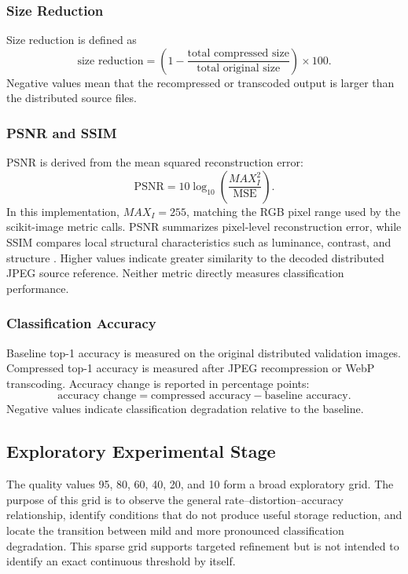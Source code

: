 \subsubsection{Size Reduction}

Size reduction is defined as
\[
\text{size reduction} =
\left(1 - \frac{\text{total compressed size}}{\text{total original size}}\right)
\times 100.
\]
Negative values mean that the recompressed or transcoded output is larger than the distributed source files.

\subsubsection{PSNR and SSIM}

PSNR is derived from the mean squared reconstruction error:
\[
\mathrm{PSNR} = 10 \log_{10}\left(\frac{MAX_I^2}{\mathrm{MSE}}\right).
\]
In this implementation, \(MAX_I = 255\), matching the RGB pixel range used by the scikit-image metric calls. PSNR summarizes pixel-level reconstruction error, while SSIM compares local structural characteristics such as luminance, contrast, and structure \cite{wang2004ssim}. Higher values indicate greater similarity to the decoded distributed JPEG source reference. Neither metric directly measures classification performance.

\subsubsection{Classification Accuracy}

Baseline top-1 accuracy is measured on the original distributed validation images. Compressed top-1 accuracy is measured after JPEG recompression or WebP transcoding. Accuracy change is reported in percentage points:
\[
\text{accuracy change} =
\text{compressed accuracy} - \text{baseline accuracy}.
\]
Negative values indicate classification degradation relative to the baseline.

\subsection{Exploratory Experimental Stage}

The quality values 95, 80, 60, 40, 20, and 10 form a broad exploratory grid. The purpose of this grid is to observe the general rate--distortion--accuracy relationship, identify conditions that do not produce useful storage reduction, and locate the transition between mild and more pronounced classification degradation. This sparse grid supports targeted refinement but is not intended to identify an exact continuous threshold by itself.

